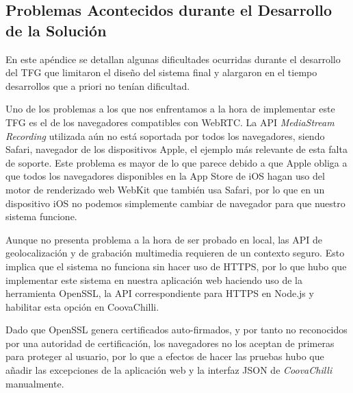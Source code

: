 \begin{appendices}
\cleardoublepage
{}%
\begin{center}
\begin{minipage}{.75\textwidth}
\section{Problemas Acontecidos durante el Desarrollo de la Solución}\label{ApendiceE}

En este apéndice se detallan algunas dificultades ocurridas durante el desarrollo del TFG que limitaron el diseño del sistema final y alargaron en el tiempo desarrollos que a priori no tenían dificultad.
\end{minipage}
\end{center}
\clearpage%

Uno de los problemas a los que nos enfrentamos a la hora de implementar este TFG es el de los navegadores compatibles con WebRTC. La API \emph{MediaStream Recording} utilizada aún no está soportada por todos los navegadores, siendo Safari, navegador de los dispositivos Apple, el ejemplo más relevante de esta falta de soporte. Este problema es mayor de lo que parece debido a que Apple obliga a que todos los navegadores disponibles en la App Store de iOS hagan uso del motor de renderizado web WebKit que también usa Safari, por lo que en un dispositivo iOS no podemos simplemente cambiar de navegador para que nuestro sistema funcione.

Aunque no presenta problema a la hora de ser probado en local, las API de geolocalización y de grabación multimedia requieren de un contexto seguro. Esto implica que el sistema no funciona sin hacer uso de HTTPS, por lo que hubo que implementar este sistema en nuestra aplicación web haciendo uso de la herramienta OpenSSL, la API correspondiente para \acrshort{HTTPS} en Node.js y habilitar esta opción en CoovaChilli.

Dado que OpenSSL genera certificados auto-firmados, y por tanto no reconocidos por una autoridad de certificación, los navegadores no los aceptan de primeras para proteger al usuario, por lo que a efectos de hacer las pruebas hubo que añadir las excepciones de la aplicación web y la interfaz JSON de \emph{CoovaChilli} manualmente.


\end{appendices}
